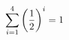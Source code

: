 \documentclass[preview]{standalone}
\begin{document}
\begin{align*}
\sum_{i=1}^{ 4 } \left({ 1 } \over {2} \right)^i = { 1 }
\end{align*}
\end{document}
